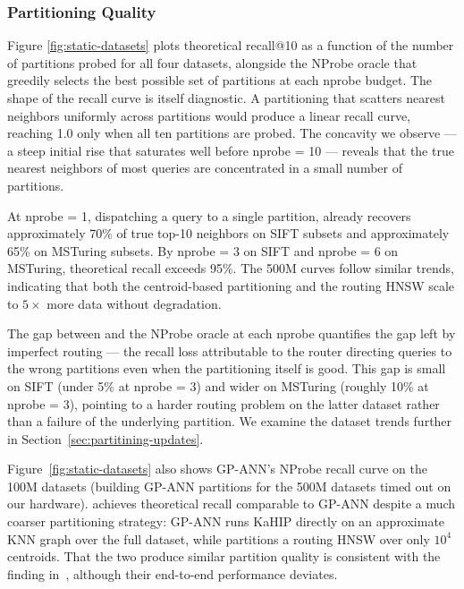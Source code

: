 \documentclass[sigconf,review,anonymous]{acmart}
\begin{document}
\subsubsection{Partitioning Quality}
\label{sec:partitioning-quality}
Figure \ref{fig:static-datasets} plots theoretical recall@10 as a function of the number of partitions probed for all four datasets, alongside the NProbe oracle that greedily selects the best possible set of partitions at each nprobe budget. The shape of the recall curve is itself diagnostic. A partitioning that scatters nearest neighbors uniformly across partitions would produce a linear recall curve, reaching 1.0 only when all ten partitions are probed. The concavity we observe — a steep initial rise that saturates well before nprobe = 10 — reveals that the true nearest neighbors of most queries are concentrated in a small number of partitions.

At nprobe = 1, dispatching a query to a single partition, \SystemName{} already recovers approximately 70\% of true top-10 neighbors on SIFT subsets and approximately 65\% on MSTuring subsets. By nprobe = 3 on SIFT and nprobe = 6 on MSTuring, theoretical recall exceeds 95\%. The 500M curves follow similar trends, indicating that both the centroid-based partitioning and the routing HNSW scale to $5\times$ more data without degradation. 

The gap between \SystemName{} and the NProbe oracle at each nprobe quantifies the gap left by imperfect routing — the recall loss attributable to the router directing queries to the wrong partitions even when the partitioning itself is good. This gap is small on SIFT (under 5\% at nprobe = 3) and wider on MSTuring (roughly 10\% at nprobe = 3), pointing to a harder routing problem on the latter dataset rather than a failure of the underlying partition. We examine the dataset trends further in Section~\ref{sec:partitining-updates}.

Figure~\ref{fig:static-datasets} also shows GP-ANN's NProbe recall curve on the 100M datasets (building GP-ANN partitions for the 500M datasets timed out on our hardware). \SystemName{} achieves theoretical recall comparable to GP-ANN despite a much coarser partitioning strategy: GP-ANN runs KaHIP directly on an approximate KNN graph over the full dataset, while \SystemName{} partitions a routing HNSW over only $10^4$ centroids. That the two produce similar partition quality is consistent with the finding in~\cite{gottensuren2025unleashing}, although their end-to-end performance deviates. 
\end{document}
